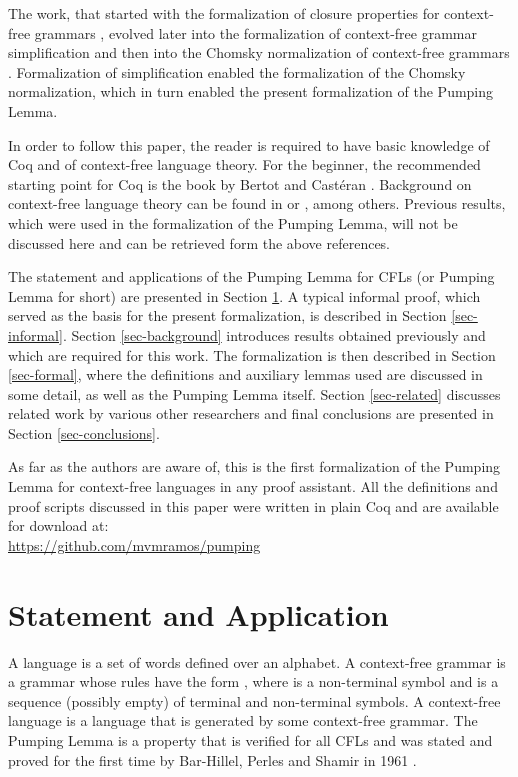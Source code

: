 \documentclass {elsarticle}
\begin{document}
The work, that started with the formalization of closure properties for context-free grammars \cite {ramos-2014}, evolved later into the formalization of context-free grammar simplification \cite {ramos-2015} and then into the Chomsky normalization of context-free grammars \cite {ramos-2016}. Formalization of simplification enabled the formalization of the Chomsky normalization, which in turn enabled the present formalization of the Pumping Lemma.

In order to follow this paper, the reader is required to have basic knowledge of Coq and of context-free language theory. For the beginner, the recommended starting point for Coq is the book by Bertot and Castéran \cite {bertot-2004}. Background on context-free language theory can be found in \cite {sudkamp-2006} or \cite {ramos-2009}, among others. Previous results, which were used in the formalization of the Pumping Lemma, will not be discussed here and can be retrieved form the above references.

The statement and applications of the Pumping Lemma for CFLs (or Pumping Lemma for short) are presented in Section \ref {sec-pumping}. A typical informal proof, which served as the basis for the present formalization, is described in Section \ref {sec-informal}. Section \ref {sec-background} introduces results obtained previously and which are required for this work. The formalization is then described in Section \ref {sec-formal}, where the definitions and auxiliary lemmas used are discussed in some detail, as well as the Pumping Lemma itself. Section \ref {sec-related} discusses related work by various other researchers and final conclusions are presented in Section \ref {sec-conclusions}.

As far as the authors are aware of, this is the first formalization of the Pumping Lemma for context-free languages in any proof assistant. All the definitions and proof scripts discussed in this paper were written in plain Coq and are available for download at: \\
\url {https://github.com/mvmramos/pumping} \\

\section {Statement and Application}
\label {sec-pumping}

A language is a set of words defined over an alphabet. A context-free grammar is a grammar whose rules have the form , where  is a non-terminal symbol and  is a sequence (possibly empty) of terminal and non-terminal symbols. A context-free language is a language that is generated by some context-free grammar. The Pumping Lemma is a property that is verified for all CFLs and was stated and proved for the first time by Bar-Hillel, Perles and Shamir in 1961 \cite {bar-hillel-1961}.
\end{document}
